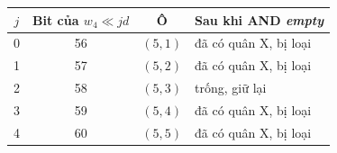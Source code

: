 \begin{tabular}{@{}cccl@{}}
\toprule
$j$ & \textbf{Bit của} $w_4 \ll j d$ & \textbf{Ô} & \textbf{Sau khi} AND \textit{empty} \\
\midrule
0 & 56 & $(5, 1)$ & đã có quân X, bị loại \\
1 & 57 & $(5, 2)$ & đã có quân X, bị loại \\
2 & 58 & $(5, 3)$ & trống, giữ lại \\
3 & 59 & $(5, 4)$ & đã có quân X, bị loại \\
4 & 60 & $(5, 5)$ & đã có quân X, bị loại \\
\bottomrule
\end{tabular}
